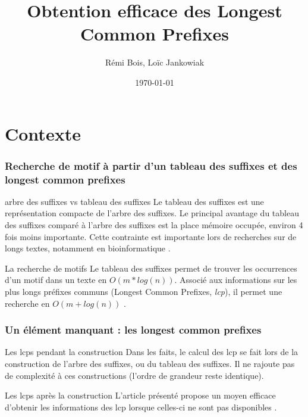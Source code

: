 \documentclass[10pt]{beamer}
\title{Obtention efficace des Longest Common Prefixes}
\author{Rémi Bois, Loïc Jankowiak}
\date{\today}
\begin{document}
\begin{frame}
  \maketitle

\end{frame}

\begin{frame}
  \tableofcontents
\end{frame}

\section{Contexte}
\label{sec:context}


\begin{frame}
  \frametitle{Recherche de motif à partir d'un tableau des suffixes
    et des longest common prefixes}

  \begin{block}{arbre des suffixes vs tableau des suffixes} 
    Le tableau des suffixes est une représentation compacte de l'arbre
    des suffixes. Le principal avantage du tableau des suffixes comparé à
    l'arbre des suffixes est la place mémoire occupée, environ 4 fois
    moins importante. Cette contrainte est importante lors de
    recherches sur de longs textes, notamment en bioinformatique \cite{Raffinot11}.
  \end{block}

  \pause

  \begin{block}{La recherche de motifs}
    Le tableau des suffixes permet de trouver les occurrences d'un
    motif dans un texte en $O(m*log(n))$. Associé aux informations sur
    les plus longs préfixes communs (Longest Common Prefixes,
    \emph{lcp}), il permet une recherche en $O(m + log(n))$ \cite{Manber93}.
  \end{block}
  
\end{frame}

\begin{frame}
  \frametitle{Un élément manquant : les longest common prefixes}

  \begin{block}{Les lcps pendant la construction}
      Dans les faits, le calcul des lcp se fait lors de la construction de
      l'arbre des suffixes, ou du tableau des suffixes. Il ne rajoute pas
      de complexité à ces constructions (l'ordre de grandeur reste
      identique).
  \end{block}
  \pause
  \begin{block}{Les lcps après la construction}
    L'article présenté propose un moyen efficace d'obtenir
    les informations des lcp lorsque celles-ci ne sont pas
    disponibles \cite{Kasai01}.
  \end{block}

\end{frame}
\end{document}
